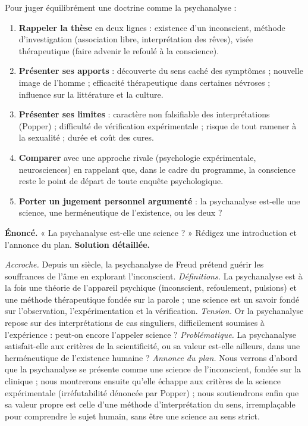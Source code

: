\documentclass[11pt]{article}
\newcommand{\cle}[1]{{\popxbold\color{popdark}#1}}
\begin{document}
\begin{methode}
Pour juger équilibrément une doctrine comme la \cle{psychanalyse} :
\begin{enumerate}
\item \textbf{Rappeler la thèse} en deux lignes : existence d'un inconscient, méthode d'investigation (association libre, interprétation des rêves), visée thérapeutique (faire advenir le refoulé à la conscience).
\item \textbf{Présenter ses apports} : découverte du sens caché des symptômes ; nouvelle image de l'homme ; efficacité thérapeutique dans certaines névroses ; influence sur la littérature et la culture.
\item \textbf{Présenter ses limites} : caractère non falsifiable des interprétations (Popper) ; difficulté de vérification expérimentale ; risque de tout ramener à la sexualité ; durée et coût des cures.
\item \textbf{Comparer} avec une approche rivale (psychologie expérimentale, neurosciences) en rappelant que, dans le cadre du programme, la conscience reste le point de départ de toute enquête psychologique.
\item \textbf{Porter un jugement personnel argumenté} : la psychanalyse est-elle une science, une \cle{herméneutique} de l'existence, ou les deux ?
\end{enumerate}
\end{methode}

\begin{exoresolu}
\textbf{Énoncé.} « La psychanalyse est-elle une science ? » Rédigez une introduction et l'annonce du plan.
\tcblower
\textbf{Solution détaillée.}

\emph{Accroche.} Depuis un siècle, la psychanalyse de Freud prétend guérir les souffrances de l'âme en explorant l'inconscient. \emph{Définitions.} La psychanalyse est à la fois une théorie de l'appareil psychique (inconscient, refoulement, pulsions) et une méthode thérapeutique fondée sur la parole ; une science est un savoir fondé sur l'observation, l'expérimentation et la vérification. \emph{Tension.} Or la psychanalyse repose sur des interprétations de cas singuliers, difficilement soumises à l'expérience : peut-on encore l'appeler science ? \emph{Problématique.} La psychanalyse satisfait-elle aux critères de la scientificité, ou sa valeur est-elle ailleurs, dans une herméneutique de l'existence humaine ? \emph{Annonce du plan.} Nous verrons d'abord que la psychanalyse se présente comme une science de l'inconscient, fondée sur la clinique ; nous montrerons ensuite qu'elle échappe aux critères de la science expérimentale (irréfutabilité dénoncée par Popper) ; nous soutiendrons enfin que sa valeur propre est celle d'une méthode d'interprétation du sens, irremplaçable pour comprendre le sujet humain, sans être une science au sens strict.
\end{exoresolu}
\end{document}
